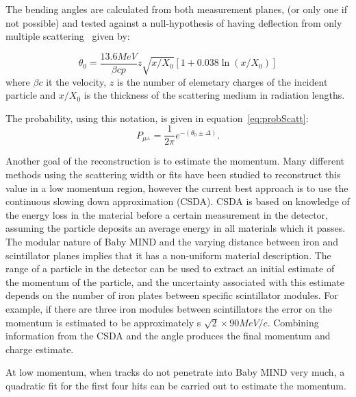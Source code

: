 The bending angles are calculated from both measurement planes, (or only one if not possible) and tested against a null-hypothesis of having deflection from only multiple scattering~\cite{13PDG} given by:

\begin{equation}
\theta_0 = \frac{13.6 MeV}{\beta cp} z \sqrt{x/X_0}[1+0.038\ln(x/X_0)]
\end{equation}
where $\beta c$ it the velocity, $z$ is the number of elemetary charges of the incident particle and $x/X_0$ is the thickness of the scattering medium in radiation lengths.

The probability, using this notation, is given in equation~\ref{eq:probScatt}:
\begin{equation}
P_{\mu^\pm} = \frac{1}{2\pi} e ^ {-( \theta_0 \pm \Delta)}.
\label{eq:probScatt}
\end{equation}

Another goal of the reconstruction is to estimate the momentum. Many different methods using the scattering width or fits have been studied to reconstruct this value in a low momentum region, however the current best approach is to use the continuous slowing down approximation (CSDA). CSDA is based on knowledge of the energy loss in the material before a certain measurement in the detector, assuming the particle deposits an average energy in all materials which it passes. The modular nature of Baby MIND and the varying distance between iron and scintillator planes implies that it has a non-uniform material description. The range of a particle in the detector can be used to extract an initial estimate of the momentum of the particle, and the uncertainty associated with this estimate depends on the number of iron plates between specific scintillator modules. For example, if there are three iron modules between scintillators the error on the momentum is estimated to be approximately s $\sqrt{2} \times 90 MeV/c$. Combining information from the CSDA and the angle produces the final momentum and charge estimate.



At low momentum, when tracks do not penetrate into Baby MIND very much, a quadratic fit for the first four hits can be carried out to estimate the momentum.

